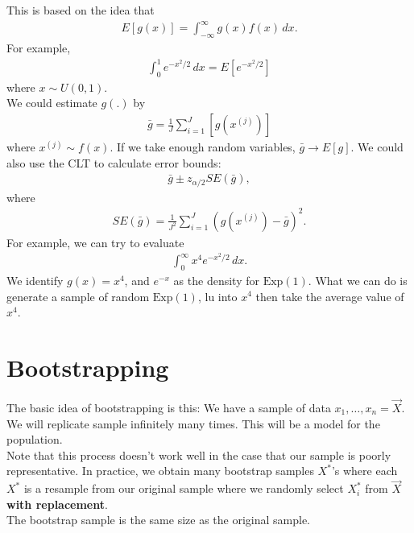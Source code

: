 \documentclass{book}
\theoremstyle{definition}
\newcommand{\al}{\alpha}
\newcommand{\f}[2]{\frac{#1}{#2}}
\newcommand{\lp}{\left(}
\newcommand{\rp}{\right)}
\begin{document}
This is based on the idea that 
\begin{align}
E[g(x)] = \int^\infty_{-\infty}g(x)f(x)\,dx.
\end{align}
For example,
\begin{align}
\int^1_0 e^{-x^2/2}\,dx = E[e^{-x^2/2}] 
\end{align}
where $x\sim U(0,1)$. \\

We could estimate $g(.)$ by 
\begin{align}
\bar g = \f{1}{J}\sum^J_{i=1}[g(x^{(j)})] 
\end{align}
where $x^{(j)} \sim f(x)$. If we take enough random variables, $\bar g \to E[g]$. We could also use the CLT to calculate error bounds:
\begin{align}
\bar g \pm z_{\al/2}SE(\bar g),
\end{align}
where 
\begin{align}
SE(\bar g) = \f{1}{J^2}\sum^J_{i=1}\lp g(x^{(j)}) - \bar g \rp^2.
\end{align}
For example, we can try to evaluate 
\begin{align}
\int^\infty_0 x^4e^{-x^2/2}\,dx.
\end{align}
We identify $g(x) = x^4$, and $e^{-x}$ as the density for $\text{Exp}(1)$. What we can do is generate a sample of random $\text{Exp}(1)$, lu into $x^4$ then take the average value of $x^4$. 






\newpage


\section{Bootstrapping}

The basic idea of bootstrapping is this: We have a sample of data $x_1,\dots,x_n = \vec{X}$. We will replicate sample infinitely many times. This will be a model for the population. \\

Note that this process doesn't work well in the case that our sample is poorly representative. In practice, we obtain many bootstrap samples $X^*$'s where each $X^*$ is a resample from our original sample where we randomly select $X^*_i$ from $\vec{X}$ \textbf{with replacement}. \\

The bootstrap sample is the same size as the original sample. \\
\end{document}
